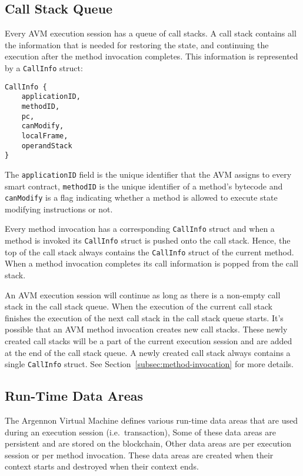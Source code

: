 \subsection{Call Stack Queue}\label{subsec:call-stack}

Every AVM execution session has a queue of call stacks. A call stack contains all the information that is needed for
restoring the state, and continuing the execution after the method invocation completes.
This information is represented by a \texttt{CallInfo} struct:
\begin{verbatim}
CallInfo {
    applicationID,
    methodID,
    pc,
    canModify,
    localFrame,
    operandStack
}
\end{verbatim}
The \texttt{applicationID} field is the unique identifier that the AVM assigns to every smart contract,
\texttt{methodID} is the unique identifier of a method's bytecode and \texttt{canModify} is a flag
indicating whether a method is allowed to execute state modifying instructions or not.

Every method invocation has a corresponding \texttt{CallInfo} struct and when a method is invoked its
\texttt{CallInfo} struct is pushed onto the call stack. Hence, the top of the call stack always contains
the \texttt{CallInfo} struct of the current method. When a method invocation completes its call
information is popped from the call stack.

An AVM execution session will continue as long as there is a non-empty call stack in the call stack queue. When the
execution of the current call stack finishes the execution of the next call stack in the call stack queue starts.
It's possible that an AVM method invocation creates new call stacks. These newly created call stacks will be a part
of the current execution session and are added at the end of the call stack queue. A newly created call stack always
contains a single \texttt{CallInfo} struct. See Section~\ref{subsec:method-invocation} for more details.

\subsection{Run-Time Data Areas}\label{subsec:data-areas}

The Argennon Virtual Machine defines various run-time data areas that are used during an execution session
(i.e.\ transaction), Some of these data areas are persistent and are stored on the blockchain, Other data areas
are per execution session or per method invocation. These data areas are created when their context starts and
destroyed when their context ends.

